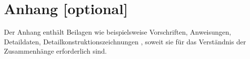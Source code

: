 \chapter{Anhang [optional]}
\label{sec: Anhang}

Der Anhang enthält Beilagen wie beispielsweise Vorschriften, Anweisungen, Detaildaten, Detailkonstruktionszeichnungen \etc, soweit sie für das Verständnis der Zusammenhänge erforderlich sind.